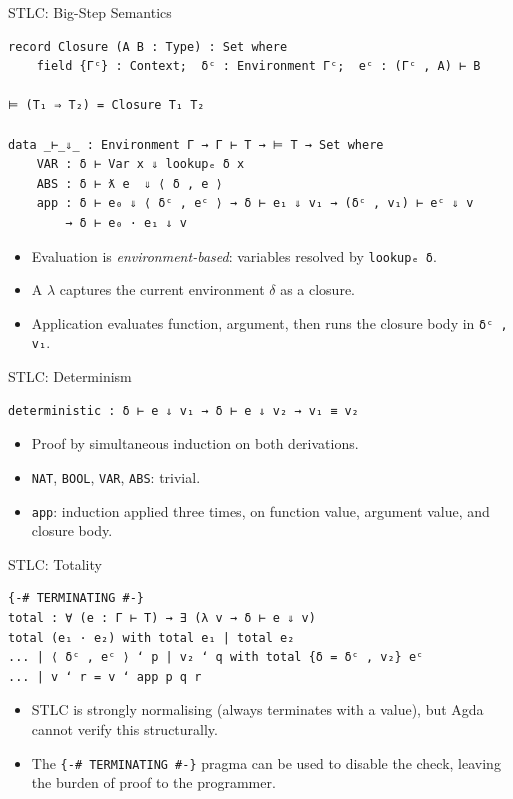\documentclass[10pt,compress,aspectratio=169]{beamer}
\begin{document}
\begin{frame}[fragile]{STLC: Big-Step Semantics}
\begin{verbatim}
record Closure (A B : Type) : Set where
    field {Γᶜ} : Context;  δᶜ : Environment Γᶜ;  eᶜ : (Γᶜ , A) ⊢ B

⊨ (T₁ ⇒ T₂) = Closure T₁ T₂

data _⊢_⇓_ : Environment Γ → Γ ⊢ T → ⊨ T → Set where
    VAR : δ ⊢ Var x ⇓ lookupₑ δ x
    ABS : δ ⊢ ƛ e  ⇓ ⟨ δ , e ⟩
    app : δ ⊢ e₀ ⇓ ⟨ δᶜ , eᶜ ⟩ → δ ⊢ e₁ ⇓ v₁ → (δᶜ , v₁) ⊢ eᶜ ⇓ v
        → δ ⊢ e₀ · e₁ ⇓ v
\end{verbatim}
\begin{itemize}
    \item Evaluation is \emph{environment-based}: variables resolved by \texttt{lookupₑ δ}.
    \item A $\lambda$ captures the current environment $\delta$ as a closure.
    \item Application evaluates function, argument, then runs the closure body in \texttt{δᶜ , v₁}.
\end{itemize}
\end{frame}

\begin{frame}[fragile]{STLC: Determinism}
\begin{verbatim}
deterministic : δ ⊢ e ⇓ v₁ → δ ⊢ e ⇓ v₂ → v₁ ≡ v₂
\end{verbatim}
\begin{itemize}
    \item Proof by simultaneous induction on both derivations.
    \item \texttt{NAT}, \texttt{BOOL}, \texttt{VAR}, \texttt{ABS}: trivial.
    \item \texttt{app}: induction applied three times, on function value, argument value, and closure body.
\end{itemize}
\end{frame}

\begin{frame}[fragile]{STLC: Totality}
\begin{verbatim}
{-# TERMINATING #-}
total : ∀ (e : Γ ⊢ T) → ∃ (λ v → δ ⊢ e ⇓ v)
total (e₁ · e₂) with total e₁ | total e₂
... | ⟨ δᶜ , eᶜ ⟩ ʻ p | v₂ ʻ q with total {δ = δᶜ , v₂} eᶜ
... | v ʻ r = v ʻ app p q r
\end{verbatim}
\begin{itemize}
    \item STLC is strongly normalising (always terminates with a value), but Agda cannot verify this structurally.
    \item The \texttt{\{-\# TERMINATING \#-\}} pragma can be used to disable the check, leaving the burden of proof to the programmer.
\end{itemize}
\end{frame}
\end{document}
